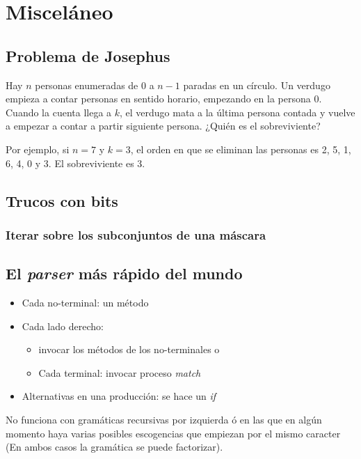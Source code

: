 \documentclass[10pt,letterpaper,twocolumn]{article}
\newcommand{\codigofuente}[1]{

\dotfill
}
\begin{document}
\section{Misceláneo}

\subsection{Problema de Josephus}

Hay $n$ personas enumeradas de $0$ a $n - 1$ paradas en un círculo. Un verdugo empieza a contar personas en sentido horario, empezando en la persona $0$. Cuando la cuenta llega a $k$, el verdugo mata a la última persona contada y vuelve a empezar a contar a partir siguiente persona. ¿Quién es el sobreviviente?

Por ejemplo, si $n = 7$ y $k = 3$, el orden en que se eliminan las personas es 2, 5, 1, 6, 4, 0 y 3. El sobreviviente es 3.

\codigofuente{./src/misc/josephus.cpp}

\subsection{Trucos con bits}
\subsubsection{Iterar sobre los subconjuntos de una máscara}

\codigofuente{./src/misc/subsets_of_mask.cpp}

\subsection{El \textit{parser} más rápido del mundo}
\begin{itemize}
\item Cada no-terminal: un método
\item Cada lado derecho:
  \begin{itemize}
  \item invocar los métodos de los no-terminales o
  \item Cada terminal: invocar proceso \textit{match}
  \end{itemize}
\item Alternativas en una producción: se hace un \textit{if}
\end{itemize}
\medskip
No funciona con gramáticas recursivas por izquierda ó en las que en algún momento haya
varias posibles escogencias que empiezan por el mismo caracter (En ambos casos la gramática se puede factorizar).
\end{document}
